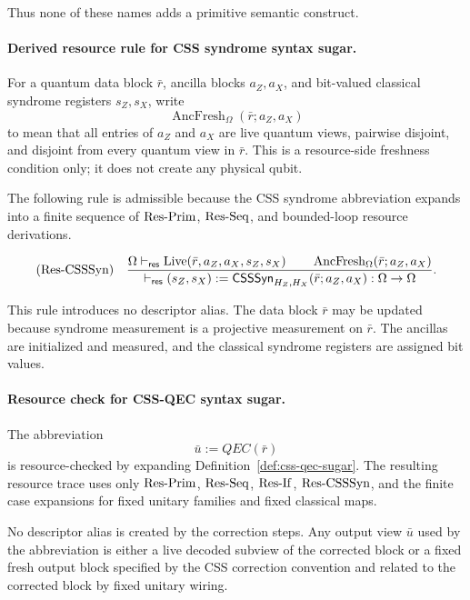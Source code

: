 \documentclass[acmsmall,screen,review,anonymous,nonacm]{acmart}
\theoremstyle{defn_style}
\begin{document}
Thus none of these names adds a primitive semantic construct.

\paragraph{Derived resource rule for CSS syndrome syntax sugar.}

For a quantum data block \(\bar r\), ancilla blocks \(a_Z,a_X\), and
bit-valued classical syndrome registers \(s_Z,s_X\), write
\[
\operatorname{AncFresh}_{\Omega}(\bar r;a_Z,a_X)
\]
to mean that all entries of \(a_Z\) and \(a_X\) are live quantum views,
pairwise disjoint, and disjoint from every quantum view in \(\bar r\). This is
a resource-side freshness condition only; it does not create any physical
qubit.

The following rule is admissible because the CSS syndrome abbreviation expands
into a finite sequence of \({\rm Res\mbox{-}Prim}\),
\({\rm Res\mbox{-}Seq}\), and bounded-loop resource derivations.

\[
\text{\rm (Res-CSSSyn)}
\quad
\frac{
\Omega\vdash_{\mathsf{res}}
\operatorname{Live}(\bar r,a_Z,a_X,s_Z,s_X)
\qquad
\operatorname{AncFresh}_{\Omega}(\bar r;a_Z,a_X)
}{
\vdash_{\mathsf{res}}
(s_Z,s_X):=
\mathsf{CSSSyn}_{H_Z,H_X}(\bar r;a_Z,a_X)
:
\Omega\rightarrow\Omega
}.
\]

This rule introduces no descriptor alias. The data block \(\bar r\) may be
updated because syndrome measurement is a projective measurement on \(\bar r\).
The ancillas are initialized and measured, and the classical syndrome registers
are assigned bit values.

\paragraph{Resource check for CSS-QEC syntax sugar.}

The abbreviation
\[
\bar u := QEC(\bar r)
\]
is resource-checked by expanding Definition~\ref{def:css-qec-sugar}. The
resulting resource trace uses only \({\rm Res\mbox{-}Prim}\),
\({\rm Res\mbox{-}Seq}\), \({\rm Res\mbox{-}If}\),
\({\rm Res\mbox{-}CSSSyn}\), and the finite case expansions for fixed unitary
families and fixed classical maps.

No descriptor alias is created by the correction steps. Any output view
\(\bar u\) used by the abbreviation is either a live decoded subview of the
corrected block or a fixed fresh output block specified by the CSS correction
convention and related to the corrected block by fixed unitary wiring.
\end{document}
